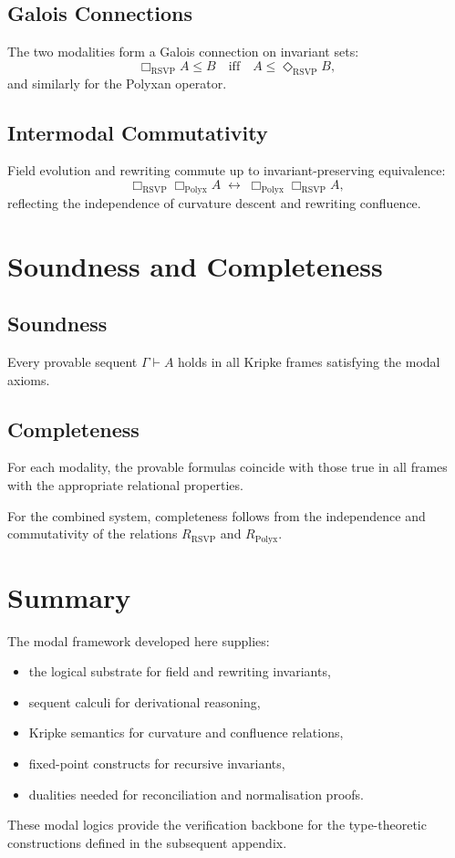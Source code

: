 \subsection{Galois Connections}

The two modalities form a Galois connection on invariant sets:
\[
\Box_{\mathrm{RSVP}}A \leq B
\quad\text{iff}\quad
A \leq \Diamond_{\mathrm{RSVP}}B,
\]
and similarly for the Polyxan operator.

\subsection{Intermodal Commutativity}

Field evolution and rewriting commute up to invariant-preserving equivalence:
\[
\Box_{\mathrm{RSVP}}\Box_{\mathrm{Polyx}}A
\;\leftrightarrow\;
\Box_{\mathrm{Polyx}}\Box_{\mathrm{RSVP}}A,
\]
reflecting the independence of curvature descent and rewriting confluence.

\section{Soundness and Completeness}

\subsection{Soundness}

Every provable sequent $\Gamma \vdash A$ holds in all Kripke frames satisfying the modal axioms.

\subsection{Completeness}

For each modality, the provable formulas coincide with those true in all frames with the appropriate relational properties.

For the combined system, completeness follows from the independence and commutativity of the relations $R_{\mathrm{RSVP}}$ and $R_{\mathrm{Polyx}}$.

\section{Summary}

The modal framework developed here supplies:
\begin{itemize}
\item the logical substrate for field and rewriting invariants,
\item sequent calculi for derivational reasoning,
\item Kripke semantics for curvature and confluence relations,
\item fixed-point constructs for recursive invariants,
\item dualities needed for reconciliation and normalisation proofs.
\end{itemize}

These modal logics provide the verification backbone for the type-theoretic constructions defined in the subsequent appendix.

